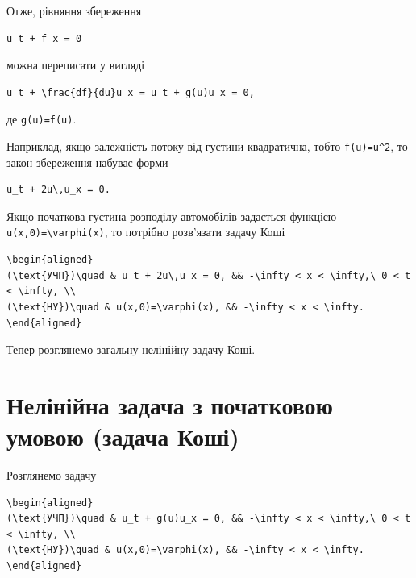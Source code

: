 \documentclass[
  ukrainian,
]{article}
\begin{document}
Отже, рівняння збереження

\begin{verbatim}
u_t + f_x = 0
\end{verbatim}

можна переписати у вигляді

\begin{verbatim}
u_t + \frac{df}{du}u_x = u_t + g(u)u_x = 0,
\end{verbatim}

де \texttt{g(u)=f\textquotesingle{}(u)}.

Наприклад, якщо залежність потоку від густини квадратична, тобто
\texttt{f(u)=u\^{}2}, то закон збереження набуває форми

\begin{verbatim}
u_t + 2u\,u_x = 0.
\end{verbatim}

Якщо початкова густина розподілу автомобілів задається функцією
\texttt{u(x,0)=\textbackslash{}varphi(x)}, то потрібно розв'язати задачу
Коші

\begin{verbatim}
\begin{aligned}
(\text{УЧП})\quad & u_t + 2u\,u_x = 0, && -\infty < x < \infty,\ 0 < t < \infty, \\
(\text{НУ})\quad & u(x,0)=\varphi(x), && -\infty < x < \infty.
\end{aligned}
\end{verbatim}

Тепер розглянемо загальну нелінійну задачу Коші.

\section{Нелінійна задача з початковою умовою (задача
Коші)}\label{ux43dux435ux43bux456ux43dux456ux439ux43dux430-ux437ux430ux434ux430ux447ux430-ux437-ux43fux43eux447ux430ux442ux43aux43eux432ux43eux44e-ux443ux43cux43eux432ux43eux44e-ux437ux430ux434ux430ux447ux430-ux43aux43eux448ux456}

Розглянемо задачу

\begin{verbatim}
\begin{aligned}
(\text{УЧП})\quad & u_t + g(u)u_x = 0, && -\infty < x < \infty,\ 0 < t < \infty, \\
(\text{НУ})\quad & u(x,0)=\varphi(x), && -\infty < x < \infty.
\end{aligned}
\end{verbatim}
\end{document}
